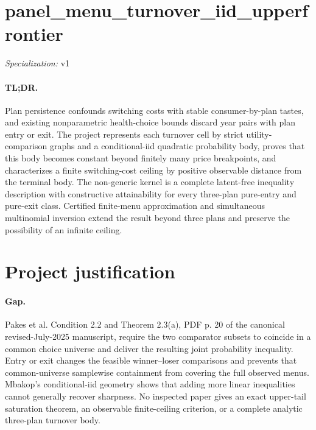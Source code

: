 \documentclass{article}
\begin{document}
\sloppy

\section*{panel\_\allowbreak{}menu\_\allowbreak{}turnover\_\allowbreak{}iid\_\allowbreak{}upperfrontier}

\noindent\textit{Specialization:} v1\par

\paragraph{TL;DR.} Plan persistence confounds switching costs with stable consumer-by-plan tastes, and existing nonparametric health-choice bounds discard year pairs with plan entry or exit. The project represents each turnover cell by strict utility-comparison graphs and a conditional-iid quadratic probability body, proves that this body becomes constant beyond finitely many price breakpoints, and characterizes a finite switching-cost ceiling by positive observable distance from the terminal body. The non-generic kernel is a complete latent-free inequality description with constructive attainability for every three-plan pure-entry and pure-exit class. Certified finite-menu approximation and simultaneous multinomial inversion extend the result beyond three plans and preserve the possibility of an infinite ceiling.

\section{Project justification}

\paragraph{Gap.} Pakes et al. Condition 2.2 and Theorem 2.3(a), PDF p. 20 of the canonical revised-July-2025 manuscript, require the two comparator subsets to coincide in a common choice universe and deliver the resulting joint probability inequality. Entry or exit changes the feasible winner--loser comparisons and prevents that common-universe samplewise containment from covering the full observed menus. Mbakop's conditional-iid geometry shows that adding more linear inequalities cannot generally recover sharpness. No inspected paper gives an exact upper-tail saturation theorem, an observable finite-ceiling criterion, or a complete analytic three-plan turnover body.
\end{document}
